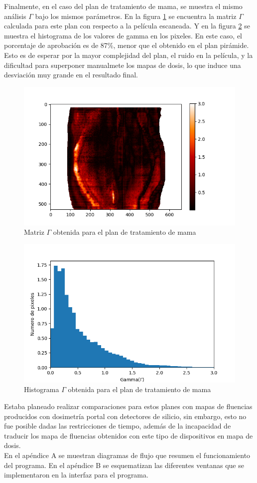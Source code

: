 Finalmente, en el caso del plan de tratamiento de mama, se muestra el mismo análisis $\Gamma$ bajo los mismos parámetros. En la figura \ref{fig:matrixGAmmaMAma} se encuentra la matriz $\Gamma$ calculada para este plan con respecto a la película escaneada. Y en la figura \ref{fig:histogramaGAmmaMama} se muestra el histograma de los valores de gamma en los pixeles. En este caso, el porcentaje de aprobación es de 87\%, menor que el obtenido en el plan pirámide. Esto es de esperar por la mayor complejidad del plan, el ruido en la película, y la dificultad para superponer manualmete los mapas de dosis, lo que induce una desviación muy grande en el resultado final.\\

\begin{figure}[H]
	\centering
	\includegraphics[width=0.7\linewidth]{images/gammaMama.png}
	\caption{Matriz $\Gamma$ obtenida para el plan de tratamiento de mama }
	\label{fig:matrixGAmmaMAma}
\end{figure}
\begin{figure}[H]
	\centering
	\includegraphics[width=0.7\linewidth]{images/histogramaDosisMama.png}
	\caption{Histograma $\Gamma$ obtenida para el plan de tratamiento de mama  }
	\label{fig:histogramaGAmmaMama}
\end{figure}

Estaba planeado realizar comparaciones para estos planes con mapas de fluencias producidos con dosimetría portal con detectores de silicio, sin embargo, esto no fue posible dadas las restricciones de tiempo, además de la incapacidad de traducir los mapa de fluencias obtenidos con este tipo de dispositivos en mapa de dosis.\\

En el apéndice A se muestran diagramas de flujo que resumen el funcionamiento del programa. En el apéndice B se esquematizan las diferentes ventanas que se implementaron en la interfaz para el programa.\\ 





